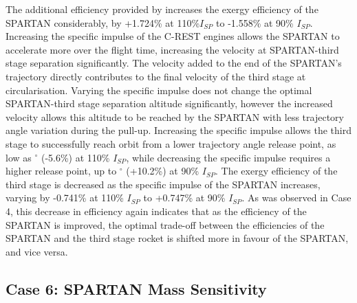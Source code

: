 The additional efficiency provided by increases the exergy efficiency of the SPARTAN considerably, by +1.724\% at 110\%$I_{SP}$ to -1.558\% at 90\% $I_{SP}$. 
Increasing the specific impulse of the C-REST engines allows the SPARTAN to accelerate more over the flight time, increasing the velocity at SPARTAN-third stage separation significantly. The velocity added to the end of the SPARTAN's trajectory directly contributes to the final velocity of the third stage at circularisation. Varying the specific impulse does not change the optimal SPARTAN-third stage separation altitude significantly, however the increased velocity allows this altitude to be reached by the SPARTAN with less trajectory angle variation during the pull-up. Increasing the specific impulse allows the third stage to successfully reach orbit from a lower trajectory angle release point, as low as \secondthirdSeparationgammaIspOneHundredTenNoReturn$^\circ$ (-5.6\%) at 110\% $I_{SP}$, while decreasing the specific impulse requires a higher release point, up to \secondthirdSeparationgammaIspNinetyNoReturn$^\circ$ (+10.2\%) at 90\% $I_{SP}$.
The exergy efficiency of the third stage is decreased as the specific impulse of the SPARTAN increases, varying by -0.741\% at 110\% $I_{SP}$ to +0.747\% at 90\% $I_{SP}$. As was observed in Case 4, this decrease in efficiency again indicates that as the efficiency of the SPARTAN is improved, the optimal trade-off between the efficiencies of the SPARTAN and the third stage rocket is shifted more in favour of the SPARTAN, and vice versa. 


\subsection{Case 6: SPARTAN Mass Sensitivity}\label{sec:SpartanMassnoreturn}



